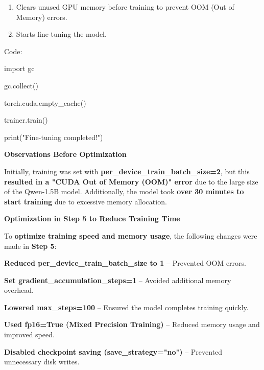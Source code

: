 \documentclass{article} %
\begin{document}
\begin{enumerate}
\item  Clears unused GPU memory before training to prevent OOM (Out of Memory) errors.

\item  Starts fine-tuning the model.
\end{enumerate}

\noindent \begin{flushleft}
Code:

\noindent import gc

\noindent gc.collect()

\noindent torch.cuda.empty\_cache()

\noindent trainer.train()

\noindent print("Fine-tuning completed!")
\newline

\noindent \textbf{}
\newline

\noindent \textbf{Observations Before Optimization}

\noindent Initially, training was set with \textbf{per\_device\_train\_batch\_size=2}, but this \textbf{resulted in a "CUDA Out of Memory (OOM)" error} due to the large size of the Qwen-1.5B model. Additionally, the model took \textbf{over 30 minutes to start training} due to excessive memory allocation.
\newline

\noindent \textbf{Optimization in Step 5 to Reduce Training Time}
\newline

\noindent To \textbf{optimize training speed and memory usage}, the following changes were made in \textbf{Step 5}:

\noindent \textbf{Reduced per\_device\_train\_batch\_size to 1} -- Prevented OOM errors.

\noindent \textbf{Set gradient\_accumulation\_steps=1} -- Avoided additional memory overhead.

\noindent \textbf{Lowered max\_steps=100} -- Ensured the model completes training quickly.

\noindent \textbf{Used fp16=True (Mixed Precision Training)} -- Reduced memory usage and improved speed.

\noindent \textbf{Disabled checkpoint saving (save\_strategy="no")} -- Prevented unnecessary disk writes.


\end{flushleft}
\end{document}
